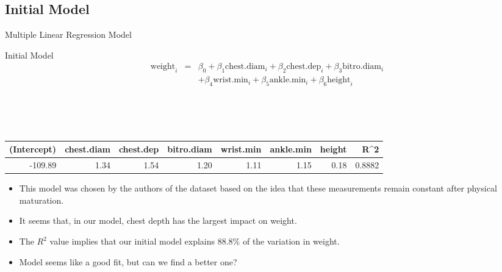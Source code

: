 \documentclass[table]{beamer}\usepackage[]{graphicx}\usepackage[]{color}
\begin{document}

\subsection{Initial Model}


\begin{frame}{Multiple Linear Regression Model}

\begin{block}{Initial Model}
\begin{eqnarray*}
\text{weight}_i &=& \beta_0 + \beta_1 \text{chest.diam}_{i} + \beta_2 \text{chest.dep}_{i} + \beta_3 \text{bitro.diam}_{i} \\
&& + \beta_4 \text{wrist.min}_{i} + \beta_5 \text{ankle.min}_{i} + \beta_6 \text{height}_{i}
\end{eqnarray*}
\end{block}

\\

\\

\\

{\fontsize{0.275cm}{1em}\selectfont 
\begin{tabular}{|r|r|r|r|r|r|r|r|}
\hline
    (Intercept) & chest.diam & chest.dep & bitro.diam & wrist.min & ankle.min & height & R^2 \\ \hline
   -109.89 & 1.34  & 1.54 & 1.20  & 1.11 & 1.15 & 0.18 & 0.8882 \\ \hline
\end{tabular}

\begin{itemize}
  \item This model was chosen by the authors of the dataset based on the idea that these measurements remain constant after physical maturation.
  \item It seems that, in our model, chest depth has the largest impact on weight.
  \item The $R^2$ value implies that our initial model explains 88.8\% of the variation in weight.
  \item Model seems like a good fit, but can we find a better one?
\end{itemize}

}
\end{frame}
\end{document}
